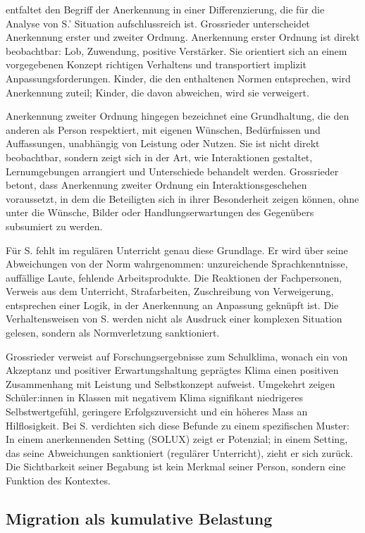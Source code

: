 \documentclass[ngerman, a4paper]{article}
\begin{document}
\textcite{grossrieder2010anerkennung} entfaltet den Begriff der Anerkennung in einer Differenzierung, die für
die Analyse von S.' Situation aufschlussreich ist. Grossrieder unterscheidet Anerkennung
erster und zweiter Ordnung. Anerkennung erster Ordnung ist direkt beobachtbar: Lob,
Zuwendung, positive Verstärker. Sie orientiert sich an einem vorgegebenen Konzept
richtigen Verhaltens und transportiert implizit Anpassungsforderungen. Kinder, die den
enthaltenen Normen entsprechen, wird Anerkennung zuteil; Kinder, die davon abweichen,
wird sie verweigert.

Anerkennung zweiter Ordnung hingegen bezeichnet eine Grundhaltung, die den anderen als
Person respektiert, mit eigenen Wünschen, Bedürfnissen und Auffassungen, unabhängig
von Leistung oder Nutzen. Sie ist nicht direkt beobachtbar, sondern zeigt sich in der
Art, wie Interaktionen gestaltet, Lernumgebungen arrangiert und Unterschiede behandelt
werden. Grossrieder betont, dass Anerkennung zweiter Ordnung ein
Interaktionsgeschehen voraussetzt, in dem die Beteiligten sich in ihrer Besonderheit
zeigen können, ohne unter die Wünsche, Bilder oder Handlungserwartungen des
Gegenübers subsumiert zu werden.

Für S. fehlt im regulären Unterricht genau diese Grundlage. Er wird über seine
Abweichungen von der Norm wahrgenommen: unzureichende Sprachkenntnisse,
auffällige Laute, fehlende Arbeitsprodukte. Die Reaktionen der Fachpersonen,
Verweis aus dem Unterricht, Strafarbeiten, Zuschreibung von Verweigerung,
entsprechen einer Logik, in der Anerkennung an Anpassung geknüpft ist. Die
Verhaltensweisen von S. werden nicht als Ausdruck einer komplexen Situation gelesen,
sondern als Normverletzung sanktioniert.

Grossrieder verweist auf Forschungsergebnisse zum Schulklima, wonach ein von
Akzeptanz und positiver Erwartungshaltung geprägtes Klima einen positiven Zusammenhang
mit Leistung und Selbstkonzept aufweist. Umgekehrt zeigen Schüler:innen in Klassen mit
negativem Klima signifikant niedrigeres Selbstwertgefühl, geringere Erfolgszuversicht
und ein höheres Mass an Hilflosigkeit. Bei S. verdichten sich diese Befunde zu einem
spezifischen Muster: In einem anerkennenden Setting (SOLUX) zeigt er Potenzial; in
einem Setting, das seine Abweichungen sanktioniert (regulärer Unterricht), zieht er
sich zurück. Die Sichtbarkeit seiner Begabung ist kein Merkmal seiner Person, sondern
eine Funktion des Kontextes.

\subsection{Migration als kumulative Belastung}
\end{document}
